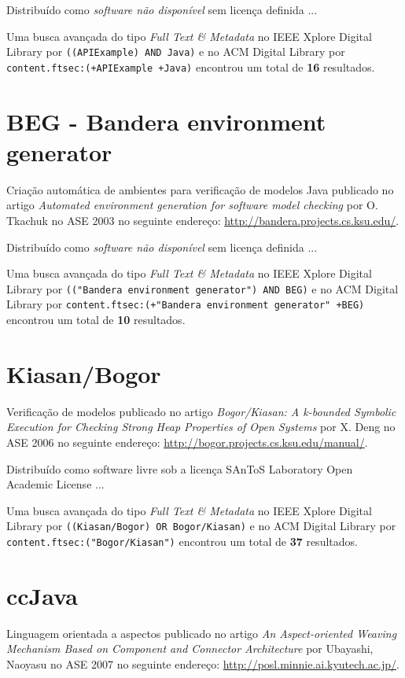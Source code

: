 Distribuído como {\it software não disponível}
sem licença definida ...


Uma busca avançada do tipo {\it Full Text \& Metadata} no IEEE Xplore Digital Library por
\texttt{((APIExample) AND Java)}
e no ACM Digital Library por
\texttt{content.ftsec:(+APIExample +Java)}
encontrou um total de
{\bf 16}
resultados.

\section{BEG - Bandera environment generator}

Criação automática de ambientes para verificação de modelos Java
publicado no artigo
{\it Automated environment generation for software model checking}
por
O. Tkachuk
no
ASE
2003
no seguinte endereço:
\url{http://bandera.projects.cs.ksu.edu/}.

Distribuído como {\it software não disponível}
sem licença definida ...


Uma busca avançada do tipo {\it Full Text \& Metadata} no IEEE Xplore Digital Library por
\texttt{(("Bandera environment generator") AND BEG)}
e no ACM Digital Library por
\texttt{content.ftsec:(+"Bandera environment generator" +BEG)}
encontrou um total de
{\bf 10}
resultados.

\section{Kiasan/Bogor}

Verificação de modelos
publicado no artigo
{\it Bogor/Kiasan: A k-bounded Symbolic Execution for Checking Strong Heap Properties of Open Systems}
por
X. Deng
no
ASE
2006
no seguinte endereço:
\url{http://bogor.projects.cs.ksu.edu/manual/}.

Distribuído como software livre
sob a licença SAnToS Laboratory Open Academic License ...


Uma busca avançada do tipo {\it Full Text \& Metadata} no IEEE Xplore Digital Library por
\texttt{((Kiasan/Bogor) OR Bogor/Kiasan)}
e no ACM Digital Library por
\texttt{content.ftsec:("Bogor/Kiasan")}
encontrou um total de
{\bf 37}
resultados.

\section{ccJava}

Linguagem orientada a aspectos
publicado no artigo
{\it An Aspect-oriented Weaving Mechanism Based on Component and Connector Architecture}
por
Ubayashi, Naoyasu
no
ASE
2007
no seguinte endereço:
\url{http://posl.minnie.ai.kyutech.ac.jp/}.

